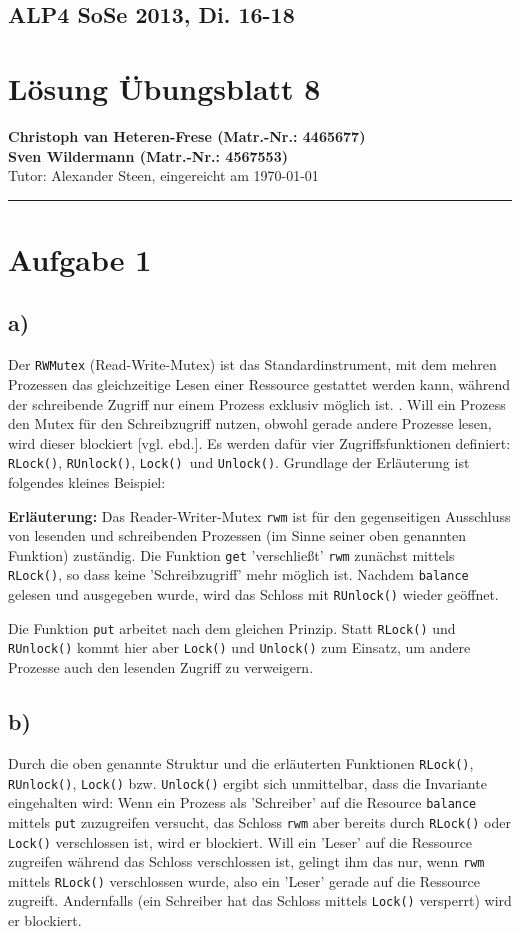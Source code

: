 \documentclass[11pt,a4paper,DIV=10,]{scrartcl}
\begin{document}
\subsection*{ALP4 SoSe 2013, Di. 16-18}
\section*{Lösung Übungsblatt 8}
\textbf{Christoph van Heteren-Frese (Matr.-Nr.: 4465677)} \\ \textbf{Sven Wildermann (Matr.-Nr.: 4567553)}\\
Tutor: Alexander Steen, eingereicht am \today\\
\hrule
\section*{Aufgabe 1}
\subsection*{a)}
Der \texttt{RWMutex} (Read-Write-Mutex) ist das Standardinstrument, mit dem mehren Prozessen das gleichzeitige Lesen einer Ressource gestattet werden kann, während der schreibende Zugriff nur einem Prozess exklusiv möglich ist. \cite[vgl.][S. 185]{Feike2010}. Will ein Prozess den Mutex für den Schreibzugriff nutzen, obwohl gerade andere Prozesse lesen, wird dieser blockiert [vgl. ebd.]. Es werden dafür vier Zugriffsfunktionen definiert: \texttt{RLock()}, \texttt{RUnlock()}, \texttt{Lock() }und \texttt{Unlock()}. 
Grundlage der Erläuterung ist folgendes kleines Beispiel:

\textbf{Erläuterung:} Das Reader-Writer-Mutex \texttt{rwm} ist für den gegenseitigen Ausschluss von lesenden und schreibenden Prozessen (im Sinne seiner oben genannten Funktion) zuständig. Die Funktion \texttt{get} 'verschließt' \texttt{rwm} zunächst mittels \texttt{RLock()}, so dass keine 'Schreibzugriff' mehr möglich ist.  Nachdem \texttt{balance} gelesen und ausgegeben wurde, wird das Schloss mit \texttt{RUnlock()} wieder geöffnet. 

Die Funktion \texttt{put} arbeitet nach dem gleichen Prinzip. Statt \texttt{RLock()} und \texttt{RUnlock()} kommt hier aber \texttt{Lock()} und \texttt{Unlock()} zum Einsatz, um andere Prozesse auch den lesenden Zugriff zu verweigern. 
\subsection*{b)}
Durch die oben genannte Struktur und die erläuterten Funktionen \texttt{RLock()}, \texttt{RUnlock()}, \texttt{Lock()} bzw. \texttt{Unlock()} ergibt sich unmittelbar, dass die Invariante eingehalten wird: Wenn ein Prozess als 'Schreiber' auf die Resource \texttt{balance}  mittels \texttt{put} zuzugreifen versucht, das Schloss \texttt{rwm} aber bereits durch \texttt{RLock()} oder \texttt{Lock()} verschlossen ist, wird er blockiert. Will ein 'Leser' auf die Ressource zugreifen während das Schloss verschlossen ist, gelingt ihm das nur, wenn \texttt{rwm} mittels \texttt{RLock()} verschlossen wurde, also ein 'Leser' gerade auf die Ressource zugreift. Andernfalls (ein Schreiber hat das Schloss mittels \texttt{Lock()} versperrt) wird er blockiert. 
\end{document}
